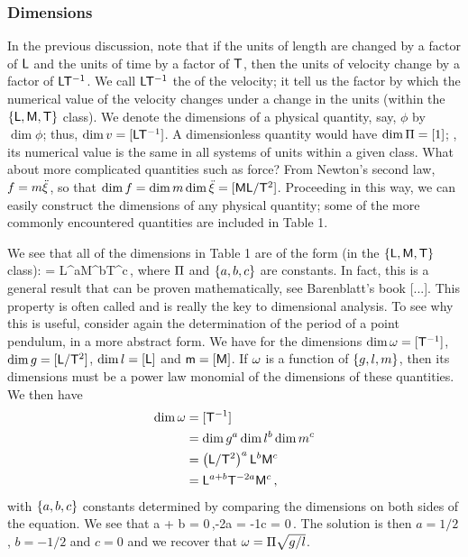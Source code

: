 \subsubsection{Dimensions}
In the previous discussion, note that if the units of length are changed by a factor of $\mathsf{L}$ and the units of time by a factor of $\mathsf{T}$, then the units of velocity change by a factor of $\mathsf{L}\mathsf{T}^{-1}$. We call $\mathsf{L}\mathsf{T}^{-1}$ the  of the velocity; it tell us the factor by which the numerical value of the velocity changes under a change in the units (within the $\left\lbrace{\mathsf{L}, \mathsf{M}, \mathsf{T}}\right\rbrace$ class). We denote the dimensions of a physical quantity, say, $\phi$ by $\dim\phi$; thus, $\dim v = [\mathsf{L}\mathsf{T}^{-1}]$. A dimensionless quantity would have $\dim\Pi = [1]$; \ie, its numerical value is the same in all systems of units within a given class. What about more complicated quantities such as force? From Newton's second law, $f = m\ddot{\xi}$, so that $\dim f = \dim m\dim\ddot{\xi} = [\mathsf{M}\mathsf{L}/\mathsf{T}^2]$. Proceeding in this way, we can easily construct the dimensions of any physical quantity; some of the more commonly encountered quantities are included in Table 1.

We see that all of the dimensions in Table 1 are  of the form (in the $\left\lbrace{\mathsf{L}, \mathsf{M}, \mathsf{T}}\right\rbrace$ class):
\beq
\dim\phi = \kdim\phdim L^a\phdim M^b\phdim T^c\,,
\eeq
where $\Pi$ and $\left\lbrace{a,b,c}\right\rbrace$ are constants. In fact, this is a general result that can be proven mathematically, see Barenblatt's book [...]. This property is often called  and is really the key to dimensional analysis. To see why this is useful, consider again the determination of the period of a point pendulum, in a more abstract form. We have for the dimensions $\dim\omega = [\mathsf{T}^{-1}]$, $\dim g = [\mathsf{L}/\mathsf{T}^2]$, $\dim l = [\mathsf{L}]$ and $\mathsf{m} = [\mathsf{M}]$. If $\omega$ is a function of $\left\lbrace{g, l, m}\right\rbrace$, then its dimensions must be a power law monomial of the dimensions of these quantities. We then have
  \begin{align*}
    \dim\omega &= [\mathsf{T}^{-1}] \\
                 &= \dim g^a \dim l^b \dim m^c \\
                 &= \left(\mathsf{L}/\mathsf{T}^2\right)^a \mathsf{L}^b \mathsf{M}^c \\
                 &= \mathsf{L}^{a + b} \mathsf{T}^{-2a} \mathsf{M}^c \,,
  \end{align*}
with $\left\lbrace{a,b,c}\right\rbrace$ constants determined by comparing the dimensions on both sides of the equation. We see that 
\beq
a + b = 0\,,\qquad -2a = -1\quad{}\quad c = 0\,.
\eeq
The solution is then $a = 1/2$, $b = -1/2$ and $c = 0$ and we recover that $\omega = \Pi\sqrt{g/l}$.

